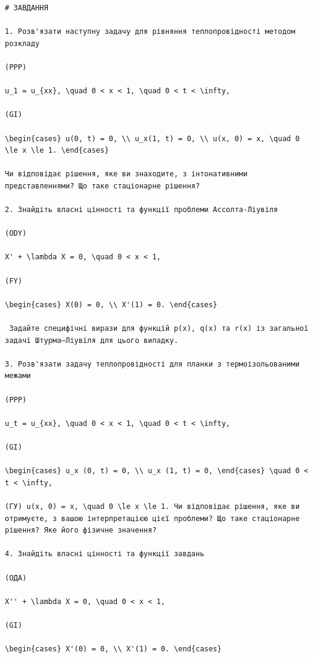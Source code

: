 \documentclass[
  ukrainian,
]{article}
\begin{document}
\begin{verbatim}
# ЗАВДАННЯ

1. Розв'язати наступну задачу для рівняння теплопровідності методом розкладу

(PPP)

u_1 = u_{xx}, \quad 0 < x < 1, \quad 0 < t < \infty,

(GI)

\begin{cases} u(0, t) = 0, \\ u_x(1, t) = 0, \\ u(x, 0) = x, \quad 0 \le x \le 1. \end{cases}

Чи відповідає рішення, яке ви знаходите, з інтонативними представленнями? Що таке стаціонарне рішення?

2. Знайдіть власні цінності та функції проблеми Ассолта-Ліувіля

(ODY)

X' + \lambda X = 0, \quad 0 < x < 1,

(FY) 

\begin{cases} X(0) = 0, \\ X'(1) = 0. \end{cases}

 Задайте специфічні вирази для функцій p(x), q(x) та r(x) із загальної задачі Штурма–Ліувіля для цього випадку.

3. Розв'язати задачу теплопровідності для планки з термоізольованими межами

(PPP)

u_t = u_{xx}, \quad 0 < x < 1, \quad 0 < t < \infty,

(GI)

\begin{cases} u_x (0, t) = 0, \\ u_x (1, t) = 0, \end{cases} \quad 0 < t < \infty,

(ГУ) u(x, 0) = x, \quad 0 \le x \le 1. Чи відповідає рішення, яке ви отримуєте, з вашою інтерпретацією цієї проблеми? Що таке стаціонарне рішення? Яке його фізичне значення?

4. Знайдіть власні цінності та функції завдань

(ОДА)

X'' + \lambda X = 0, \quad 0 < x < 1,

(GI) 

\begin{cases} X'(0) = 0, \\ X'(1) = 0. \end{cases}


\end{verbatim}
\end{document}
